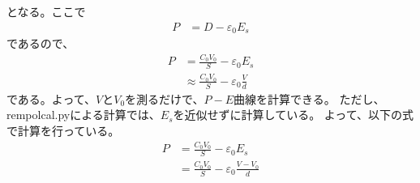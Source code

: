 \documentclass[a4j,dvipdfmx]{jsarticle}
\begin{document}
となる。ここで
\begin{align}
    P&=D-\varepsilon_{0}E_{s}
\end{align}
であるので、
\begin{align}
    P&=\frac{C_{0}V_{0}}{S}-\varepsilon_{0}E_{s}\\
    &\approx \frac{C_{0}V_{0}}{S}-\varepsilon_{0}\frac{V}{d}
\end{align}
である。よって、$V$と$V_{0}$を測るだけで、$P-E$曲線を計算できる。
ただし、rempolcal.pyによる計算では、$E_{s}$を近似せずに計算している。
よって、以下の式で計算を行っている。
\begin{align}
    P&=\frac{C_{0}V_{0}}{S}-\varepsilon_{0}E_{s}\\
    &=\frac{C_{0}V_{0}}{S}-\varepsilon_{0}\frac{V-V_{0}}{d}
\end{align}
\end{document}
